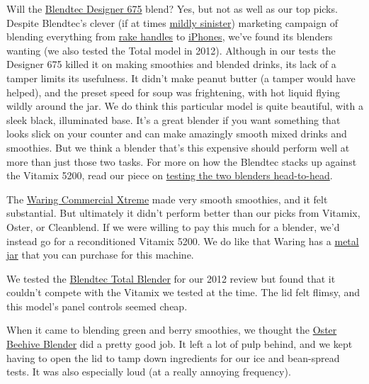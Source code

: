 Will the
\href{https://www.nytimes3xbfgragh.onion/wirecutter/out/link/26968/141467/4/76667/?merchant=Amazon}{Blendtec
Designer 675} blend? Yes, but not as well as our top picks. Despite
Blendtec's clever (if at times
\href{http://www.willitblend.com/videos/minecraft-frozen}{mildly
sinister}) marketing campaign of blending everything from
\href{https://www.youtube.com/watch?v=aM94aorYVS4}{rake handles} to
\href{https://www.youtube.com/watch?v=lBUJcD6Ws6s}{iPhones}, we've found
its blenders wanting (we also tested the Total model in 2012). Although
in our tests the Designer 675 killed it on making smoothies and blended
drinks, its lack of a tamper limits its usefulness. It didn't make
peanut butter (a tamper would have helped), and the preset speed for
soup was frightening, with hot liquid flying wildly around the jar. We
do think this particular model is quite beautiful, with a sleek black,
illuminated base. It's a great blender if you want something that looks
slick on your counter and can make amazingly smooth mixed drinks and
smoothies. But we think a blender that's this expensive should perform
well at more than just those two tasks. For more on how the Blendtec
stacks up against the Vitamix 5200, read our piece on
\href{https://www.nytimes3xbfgragh.onion/wirecutter/reviews/vitamix-vs-blendtec/}{testing
the two blenders head-to-head}.

The
\href{https://www.nytimes3xbfgragh.onion/wirecutter/out/link/8948/25621/4/57888?merchant=Amazon}{Waring
Commercial Xtreme} made very smooth smoothies, and it felt substantial.
But ultimately it didn't perform better than our picks from Vitamix,
Oster, or Cleanblend. If we were willing to pay this much for a blender,
we'd instead go for a reconditioned Vitamix 5200. We do like that Waring
has a
\href{https://www.nytimes3xbfgragh.onion/wirecutter/out/link/8951/25631/4/57889?merchant=Amazon}{metal
jar} that you can purchase for this machine.

We tested the
\href{https://www.nytimes3xbfgragh.onion/wirecutter/out/link/8518/24610/4/57891?merchant=Amazon}{Blendtec
Total Blender} for our 2012 review but found that it couldn't compete
with the Vitamix we tested at the time. The lid felt flimsy, and this
model's panel controls seemed cheap.

When it came to blending green and berry smoothies, we thought the
\href{https://www.nytimes3xbfgragh.onion/wirecutter/out/link/36679/159116/4/109204/?merchant=Amazon}{Oster
Beehive Blender} did a pretty good job. It left a lot of pulp behind,
and we kept having to open the lid to tamp down ingredients for our ice
and bean-spread tests. It was also especially loud (at a really annoying
frequency).

